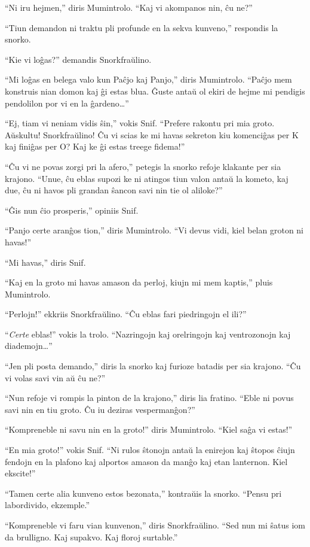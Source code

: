 ``Ni iru hejmen,'' diris Mumintrolo. ``Kaj vi akompanos nin, ĉu ne?''

``Tiun demandon ni traktu pli profunde en la sekva kunveno,'' respondis la snorko.

``Kie vi loĝas?'' demandis Snorkfraŭlino.

``Mi loĝas en belega valo kun Paĉjo kaj Panjo,'' diris Mumintrolo. ``Paĉjo mem konstruis nian domon kaj ĝi estas blua. Ĝuste antaŭ ol ekiri de hejme mi pendigis pendolilon por vi en la ĝardeno{\ldots}''

``Ej, tiam vi neniam vidis ŝin,'' vokis Snif. ``Prefere rakontu pri mia groto. Aŭskultu! Snorkfraŭlino! Ĉu vi scias ke mi havas sekreton kiu komenciĝas per K kaj finiĝas per O? Kaj ke ĝi estas treege fidema!''

``Ĉu vi ne povas zorgi pri la afero,'' petegis la snorko refoje klakante per sia krajono. ``Unue, ĉu eblas supozi ke ni atingos tiun valon antaŭ la kometo, kaj due, ĉu ni havos pli grandan ŝancon savi nin tie ol aliloke?''

``Ĝis nun ĉio prosperis,'' opiniis Snif.

``Panjo certe aranĝos tion,'' diris Mumintrolo. ``Vi devus vidi, kiel belan groton ni havas!''

``Mi havas,'' diris Snif.

``Kaj en la groto mi havas amason da perloj, kiujn mi mem kaptis,'' pluis Mumintrolo.

``Perlojn!'' ekkriis Snorkfraŭlino. ``Ĉu eblas fari piedringojn el ili?''

``\emph{Certe} eblas!'' vokis la trolo. ``Nazringojn kaj orelringojn kaj ventrozonojn kaj diademojn{\ldots}''

``Jen pli posta demando,'' diris la snorko kaj furioze batadis per sia krajono. ``Ĉu vi volas savi vin aŭ ĉu ne?''

``Nun refoje vi rompis la pinton de la krajono,'' diris lia fratino. ``Eble ni povus savi nin en tiu groto. Ĉu iu deziras vespermanĝon?''

``Kompreneble ni savu nin en la groto!'' diris Mumintrolo. ``Kiel saĝa vi estas!''

``En mia groto!'' vokis Snif. ``Ni rulos ŝtonojn antaŭ la enirejon kaj ŝtopos ĉiujn fendojn en la plafono kaj alportos amason da manĝo kaj etan lanternon. Kiel ekscite!''

``Tamen certe alia kunveno estos bezonata,'' kontraŭis la snorko. ``Pensu pri labordivido, ekzemple.''

``Kompreneble vi faru vian kunvenon,'' diris Snorkfraŭlino. ``Sed nun mi ŝatus iom da brulligno. Kaj supakvo. Kaj floroj surtable.''

